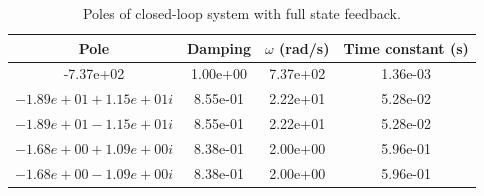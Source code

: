 \documentclass[letterpaper, 10 pt, conference]{ieeeconf}
\begin{document}
\begin{table}[h]
    \centering
    \caption{Poles of closed-loop system with full state feedback.}
    \begin{tabular}{cccc}
         \hline
         Pole & Damping & $\omega$ (rad/s) & Time constant (s) \\\hline
   -7.37e+02  &                1.00e+00  &     7.37e+02   &       1.36e-03    \\
 $-1.89e+01 + 1.15e+01i $    &8.55e-01    &   2.22e+01    &      5.28e-02    \\
 $-1.89e+01 - 1.15e+01i $  &  8.55e-01   &    2.22e+01    &      5.28e-02    \\
 $-1.68e+00 + 1.09e+00i$   &  8.38e-01    &   2.00e+00    &      5.96e-01    \\
 $-1.68e+00 - 1.09e+00i$   &  8.38e-01    &   2.00e+00     &     5.96e-01\\
        \hline
    \end{tabular}
    \label{tb:cl_poles_LQR}
\end{table}
\end{document}
